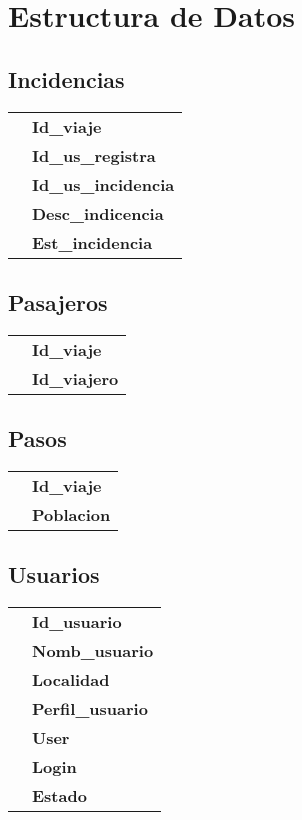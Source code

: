 \section{Estructura de Datos}
\begin{multicols}{2}
\subsection{Incidencias}
\begin{Table}
	\raggedright
	\label{struct:incidencias}
	\begin{tabular}{rl}
			\intc & \textbf{Id\_viaje}\\
			\intc & \textbf{Id\_us\_registra}\\
			\intc & \textbf{Id\_us\_incidencia}\\
			\charcp & \textbf{Desc\_indicencia}\\
			\intc & \textbf{Est\_incidencia}
		\end{tabular}
	\end{Table}
\subsection{Pasajeros}
\begin{Table}
	\raggedright
	\label{struct:pasajeros}
	\begin{tabular}{rl}
		\intc   & \textbf{Id\_viaje}\\
		\intc & \textbf{Id\_viajero}
	\end{tabular}
\end{Table}
\subsection{Pasos}
\begin{Table}
	\raggedright
	\label{struct:pasos}
	\begin{tabular}{rl}
		\intc   & \textbf{Id\_viaje}\\
		\charcp & \textbf{Poblacion}
	\end{tabular}
\end{Table}
\subsection{Usuarios}
\begin{Table}
	\raggedright
	\label{struct:usuarios}
	\begin{tabular}{rl}
		\intc & \textbf{Id\_usuario}\\
		\charcp & \textbf{Nomb\_usuario}\\
		\charcp & \textbf{Localidad}\\
		\intc & \textbf{Perfil\_usuario}\\
		\charcp & \textbf{User}\\
		\charcp & \textbf{Login}\\
		\intc & \textbf{Estado}
	\end{tabular}
\end{Table}

\end{multicols}
